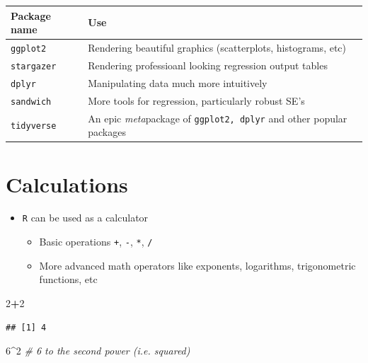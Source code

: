 \documentclass[]{book}
\newenvironment{Shaded}{\begin{snugshade}}{\end{snugshade}}
\newcommand{\DecValTok}[1]{\textcolor[rgb]{0.00,0.00,0.81}{#1}}
\newcommand{\CommentTok}[1]{\textcolor[rgb]{0.56,0.35,0.01}{\textit{#1}}}
\newcommand{\OperatorTok}[1]{\textcolor[rgb]{0.81,0.36,0.00}{\textbf{#1}}}
\providecommand{\tightlist}{%
  \setlength{\itemsep}{0pt}\setlength{\parskip}{0pt}}
\theoremstyle{definition}
\theoremstyle{definition}
\theoremstyle{definition}
\theoremstyle{remark}
\begin{document}
\begin{table}
  \begin{tabular}{ll}
  Package name & Use \\ \toprule 
  \texttt{ggplot2} & Rendering beautiful graphics (scatterplots, histograms, etc)\\
  \texttt{stargazer} & Rendering professioanl looking regression output tables\\
  \texttt{dplyr} & Manipulating data much more intuitively\\
  \texttt{sandwich} & More tools for regression, particularly robust SE's\\
  \texttt{tidyverse} & An epic \emph{meta}package of \texttt{ggplot2, dplyr} and other popular packages\\ \bottomrule
  \end{tabular}
\end{table}

\section{Calculations}\label{calculations}

\begin{itemize}
\tightlist
\item
  \texttt{R} can be used as a calculator

  \begin{itemize}
  \tightlist
  \item
    Basic operations \texttt{+}, \texttt{-}, \texttt{*}, \texttt{/}
  \item
    More advanced math operators like exponents, logarithms,
    trigonometric functions, etc
  \end{itemize}
\end{itemize}

\begin{Shaded}
\begin{Highlighting}[]
\DecValTok{2}\OperatorTok{+}\DecValTok{2}
\end{Highlighting}
\end{Shaded}

\begin{verbatim}
## [1] 4
\end{verbatim}

\begin{Shaded}
\begin{Highlighting}[]
\DecValTok{6}\OperatorTok{^}\DecValTok{2} \CommentTok{# 6 to the second power (i.e. squared)}
\end{Highlighting}
\end{Shaded}
\end{document}
